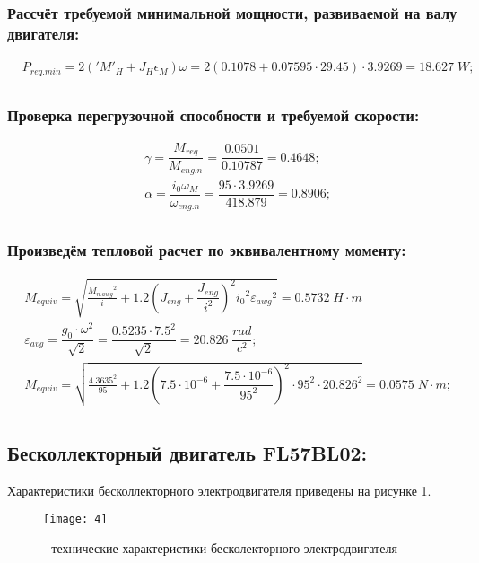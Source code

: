 \subsubsection{Рассчёт требуемой минимальной мощности, развиваемой на валу двигателя:}
\begin{equation}
	\begin{split}
		&P_{req.min}=2\left('{M'}_H+J_H \epsilon_M\right)\omega= 2\left(0.1078+0.07595\cdot 29.45\right)\cdot 3.9269 =18.627 \; W;\\
	\end{split}			
\end{equation}

\subsubsection{Проверка перегрузочной способности и требуемой скорости:}
\begin{equation}
	\begin{split}
		&\gamma=\dfrac{M_{req}}{M_{eng.n}}=\dfrac{0.0501}{0.10787}=0.4648;\\
		&\alpha=\dfrac{i_0\omega_M}{\omega_{eng.n}}=\dfrac{95\cdot 3.9269}{418.879}=0.8906 ;\\
	\end{split}			
\end{equation}

\subsubsection{Произведём тепловой расчет по эквивалентному моменту:}
\begin{equation}
	\begin{split}
		&M_{equiv}=\sqrt{\frac{{M_{n.awg}}^2}{i}+1.2{\left( J_{eng}+\dfrac{J_{eng}}{{i}^2} \right)}^2{i_0}^2{\varepsilon_{awg}}^2}=0.5732\;H\cdot m\\
		&\varepsilon_{avg} = \dfrac{g_0\cdot \omega^2}{\sqrt{2}}=\dfrac{0.5235\cdot 7.5^2}{\sqrt{2}}=20.826\; \dfrac{rad}{c^2};\\
		&M_{equiv}=\sqrt{\frac{4.3635^2}{95}+1.2{\left( 7.5\cdot 10^{-6}+\dfrac{7.5\cdot 10^{-6}}{95^2} \right)}^2\cdot 95^2\cdot 20.826^2}=0.0575\;N\cdot m;\\
	\end{split}			
\end{equation}

\subsection{Бесколлекторный двигатель FL57BL02:}
Характеристики бесколлекторного электродвигателя приведены на рисунке \ref{pic:pic_4}.
\begin{figure}[H]
	\begin{center}
		\texttt{[image: 4]}
		\caption{- технические характеристики бесколекторного электродвигателя} 
		\label{pic:pic_4} %
	\end{center}
\end{figure}

